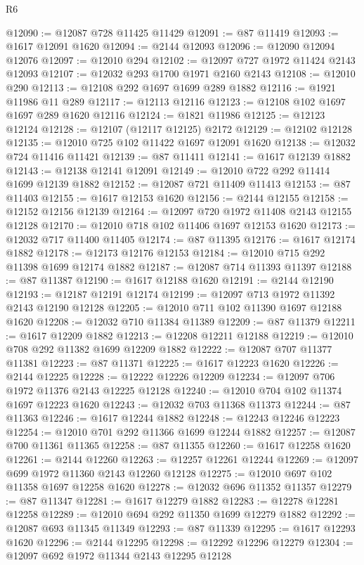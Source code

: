 \begin{lexlean}{R6}
\begin{coremodule}
@12090 := @12087 @728 @11425 @11429
@12091 := @87 @11419
@12093 := @1617 @12091 @1620
@12094 := @2144 @12093
@12096 := @12090 @12094 @12076
@12097 := @12010 @294
@12102 := @12097 @727 @1972 @11424 @2143 @12093
@12107 := @12032 @293 @1700 @1971 @2160 @2143
@12108 := @12010 @290
@12113 := @12108 @292 @1697 @1699 @289 @1882
@12116 := @1921 @11986 @11 @289
@12117 := @12113 @12116
@12123 := @12108 @102 @1697 @1697 @289 @1620 @12116
@12124 := @1821 @11986
@12125 := @12123 @12124
@12128 := @12107 (@12117 @12125) @2172
@12129 := @12102 @12128
@12135 := @12010 @725 @102 @11422 @1697 @12091 @1620
@12138 := @12032 @724 @11416 @11421
@12139 := @87 @11411
@12141 := @1617 @12139 @1882
@12143 := @12138 @12141 @12091
@12149 := @12010 @722 @292 @11414 @1699 @12139 @1882
@12152 := @12087 @721 @11409 @11413
@12153 := @87 @11403
@12155 := @1617 @12153 @1620
@12156 := @2144 @12155
@12158 := @12152 @12156 @12139
@12164 := @12097 @720 @1972 @11408 @2143 @12155 @12128
@12170 := @12010 @718 @102 @11406 @1697 @12153 @1620
@12173 := @12032 @717 @11400 @11405
@12174 := @87 @11395
@12176 := @1617 @12174 @1882
@12178 := @12173 @12176 @12153
@12184 := @12010 @715 @292 @11398 @1699 @12174 @1882
@12187 := @12087 @714 @11393 @11397
@12188 := @87 @11387
@12190 := @1617 @12188 @1620
@12191 := @2144 @12190
@12193 := @12187 @12191 @12174
@12199 := @12097 @713 @1972 @11392 @2143 @12190 @12128
@12205 := @12010 @711 @102 @11390 @1697 @12188 @1620
@12208 := @12032 @710 @11384 @11389
@12209 := @87 @11379
@12211 := @1617 @12209 @1882
@12213 := @12208 @12211 @12188
@12219 := @12010 @708 @292 @11382 @1699 @12209 @1882
@12222 := @12087 @707 @11377 @11381
@12223 := @87 @11371
@12225 := @1617 @12223 @1620
@12226 := @2144 @12225
@12228 := @12222 @12226 @12209
@12234 := @12097 @706 @1972 @11376 @2143 @12225 @12128
@12240 := @12010 @704 @102 @11374 @1697 @12223 @1620
@12243 := @12032 @703 @11368 @11373
@12244 := @87 @11363
@12246 := @1617 @12244 @1882
@12248 := @12243 @12246 @12223
@12254 := @12010 @701 @292 @11366 @1699 @12244 @1882
@12257 := @12087 @700 @11361 @11365
@12258 := @87 @11355
@12260 := @1617 @12258 @1620
@12261 := @2144 @12260
@12263 := @12257 @12261 @12244
@12269 := @12097 @699 @1972 @11360 @2143 @12260 @12128
@12275 := @12010 @697 @102 @11358 @1697 @12258 @1620
@12278 := @12032 @696 @11352 @11357
@12279 := @87 @11347
@12281 := @1617 @12279 @1882
@12283 := @12278 @12281 @12258
@12289 := @12010 @694 @292 @11350 @1699 @12279 @1882
@12292 := @12087 @693 @11345 @11349
@12293 := @87 @11339
@12295 := @1617 @12293 @1620
@12296 := @2144 @12295
@12298 := @12292 @12296 @12279
@12304 := @12097 @692 @1972 @11344 @2143 @12295 @12128

\end{coremodule}
\end{lexlean}
